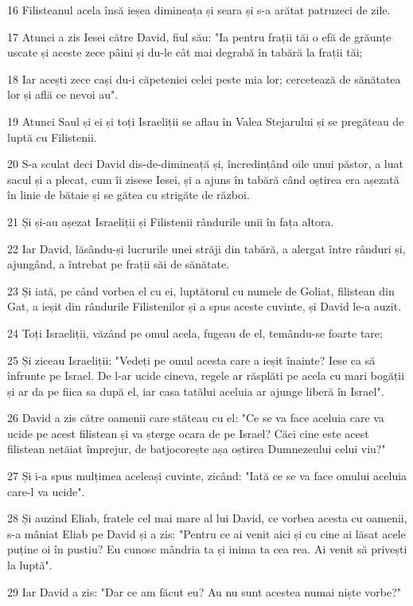\par 16 Filisteanul acela însă ieșea dimineața și seara și s-a arătat patruzeci de zile.
\par 17 Atunci a zis Iesei către David, fiul său: "Ia pentru frații tăi o efă de grăunțe uscate și aceste zece pâini și du-le cât mai degrabă în tabără la frații tăi;
\par 18 Iar acești zece cași du-i căpeteniei celei peste mia lor; cercetează de sănătatea lor și află ce nevoi au".
\par 19 Atunci Saul și ei și toți Israeliții se aflau în Valea Stejarului și se pregăteau de luptă cu Filistenii.
\par 20 S-a sculat deci David dis-de-dimineață și, încredințând oile unui păstor, a luat sacul și a plecat, cum îi zisese Iesei, și a ajuns în tabără când oștirea era așezată în linie de bătaie și se gătea cu strigăte de război.
\par 21 Și și-au așezat Israeliții și Filistenii rândurile unii în fața altora.
\par 22 Iar David, lăsându-și lucrurile unei străji din tabără, a alergat între rânduri și, ajungând, a întrebat pe frații săi de sănătate.
\par 23 Și iată, pe când vorbea el cu ei, luptătorul cu numele de Goliat, filistean din Gat, a ieșit din rândurile Filistenilor și a spus aceste cuvinte, și David le-a auzit.
\par 24 Toți Israeliții, văzând pe omul acela, fugeau de el, temându-se foarte tare;
\par 25 Și ziceau Israeliții: "Vedeți pe omul acesta care a ieșit înainte? Iese ca să înfrunte pe Israel. De l-ar ucide cineva, regele ar răsplăti pe acela cu mari bogății și ar da pe fiica sa după el, iar casa tatălui aceluia ar ajunge liberă în Israel".
\par 26 David a zis către oamenii care stăteau cu el: "Ce se va face aceluia care va ucide pe acest filistean și va șterge ocara de pe Israel? Căci cine este acest filistean netăiat împrejur, de batjocorește așa oștirea Dumnezeului celui viu?"
\par 27 Și i-a spus mulțimea aceleași cuvinte, zicând: "Iată ce se va face omului aceluia care-l va ucide".
\par 28 Și auzind Eliab, fratele cel mai mare al lui David, ce vorbea acesta cu oamenii, s-a mâniat Eliab pe David și a zis: "Pentru ce ai venit aici și cu cine ai lăsat acele puține oi în pustiu? Eu cunosc mândria ta și inima ta cea rea. Ai venit să privești la luptă".
\par 29 Iar David a zis: "Dar ce am făcut eu? Au nu sunt acestea numai niște vorbe?"
